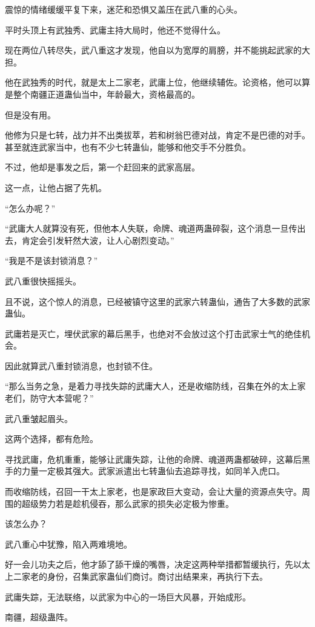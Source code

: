 \begin{this_body}
震惊的情绪缓缓平复下来，迷茫和恐惧又盖压在武八重的心头。

平时头顶上有武独秀、武庸主持大局时，他还不觉得什么。

现在两位八转尽失，武八重这才发现，他自以为宽厚的肩膀，并不能挑起武家的大担。

他在武独秀的时代，就是太上二家老，武庸上位，他继续辅佐。论资格，他可以算是整个南疆正道蛊仙当中，年龄最大，资格最高的。

但是没有用。

他修为只是七转，战力并不出类拔萃，若和树翁巴德对战，肯定不是巴德的对手。甚至就连武家当中，也有不少七转蛊仙，能够和他交手不分胜负。

不过，他却是事发之后，第一个赶回来的武家高层。

这一点，让他占据了先机。

“怎么办呢？”

“武庸大人就算没有死，但他本人失联，命牌、魂道两蛊碎裂，这个消息一旦传出去，肯定会引发轩然大波，让人心剧烈变动。”

“我是不是该封锁消息？”

武八重很快摇摇头。

且不说，这个惊人的消息，已经被镇守这里的武家六转蛊仙，通告了大多数的武家蛊仙。

武庸若是灭亡，埋伏武家的幕后黑手，也绝对不会放过这个打击武家士气的绝佳机会。

因此就算武八重封锁消息，也封锁不住。

“那么当务之急，是着力寻找失踪的武庸大人，还是收缩防线，召集在外的太上家老们，防守大本营呢？”

武八重皱起眉头。

这两个选择，都有危险。

寻找武庸，危机重重，能够让武庸失踪，让他的命牌、魂道两蛊都破碎，这幕后黑手的力量一定极其强大。武家派遣出七转蛊仙去追踪寻找，如同羊入虎口。

而收缩防线，召回一干太上家老，也是家政巨大变动，会让大量的资源点失守。周围的超级势力若是趁机侵吞，那么武家的损失必定极为惨重。

该怎么办？

武八重心中犹豫，陷入两难境地。

好一会儿功夫之后，他才舔了舔干燥的嘴唇，决定这两种举措都暂缓执行，先以太上二家老的身份，召集武家蛊仙们商讨。商讨出结果来，再执行下去。

武庸失踪，无法联络，以武家为中心的一场巨大风暴，开始成形。

南疆，超级蛊阵。


\end{this_body}
